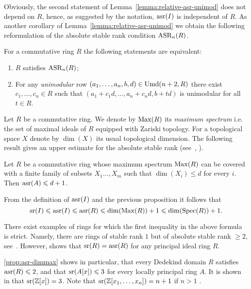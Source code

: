 Obviously, the second statement of Lemma~\ref{lemma:relative-asr-unimod} does not depend on $R$, hence, as suggested by the notation, $\operatorname{asr}(I)$ is independent of $R$.
As another corollary of Lemma~\ref{lemma:relative-asr-unimod} we obtain the following reformulation of the absolute stable rank condition $\operatorname{ASR}_n(R)$.
\begin{cor} For a commutative ring $R$ the following statements are equivalent:
\begin{enumerate}
 \item\label{asr_Stein} $R$ satisfies $\operatorname{ASR}_n(R)$;
 \item\label{asr_Bak} For any \emph{unimodular} row $(a_1,\ldots,a_n,b,d)\in\operatorname{Umd}(n+2,R)$ there exist $c_1,\ldots,c_n\in R$ such that $(a_1+c_1d,\ldots,a_n+c_nd,b+td)$ is unimodular for all $t\in R$.
\end{enumerate}
\end{cor}

Let $R$ be a commutative ring. We denote by $\operatorname{Max}(R)$ its \emph{maximum spectrum} i.e. the set of maximal ideals of $R$ equipped with Zariski topology. For a topological space $X$ denote by $\dim(X)$ its usual topological dimension.
The following result gives an upper estimate for the absolute stable rank (see~\cite[Theorem~2.3]{EO}, \cite[Theorem~3.7]{MKV}).
\begin{prop}\label{prop:asr-dimmax}
Let $R$ be a commutative ring whose maximum spectrum $\operatorname{Max}(R)$ can be covered with a finite family of subsets 
$X_1\ldots, X_m$ such that $\dim(X_i)\leqslant d$ for every $i$. Then $\operatorname{asr}(A)\leqslant d+1$.
\end{prop}
From the definition of $\operatorname{asr}(I)$ and the previous proposition it follows that
\[ \operatorname{sr}(I)\leqslant\operatorname{asr}(I)\leqslant\operatorname{asr}(R)\leqslant \dim(\operatorname{Max}(R))+1\leqslant\dim(\operatorname{Spec}(R))+1. \]
\begin{rem}
There exist examples of rings for which the first inequality in the above formula is strict. Namely, there are rings of stable rank $1$ but of absolute stable rank $\geqslant2$, see~\cite{MKV}. However, \cite[Theorem~1.3]{MKV} shows that $\operatorname{sr}(R)=\operatorname{asr}(R)$ for any principal ideal ring $R$.
\end{rem}
\cref{prop:asr-dimmax} shows in particular, that every Dedekind domain $R$ satisfies $\operatorname{asr}(R)\leqslant2$, and that $\operatorname{sr}(A[x])\leqslant3$ for every locally principal ring $A$. It is shown in \cite{GruMenVasSL2ZxSL2kxy} that $\operatorname{sr}(\mathbb{Z}[x])=3$. Note that $\operatorname{sr}(\mathbb{Z}[x_1,\ldots,x_n])=n+1$ if $n>1$ \cite[Example after Theorem~18.2]{VasSusSerreProblem}.


